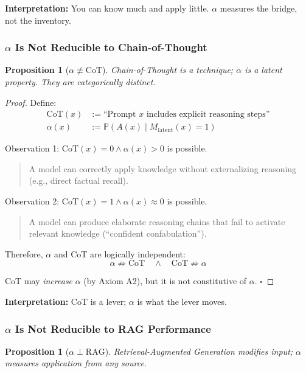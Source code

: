 \documentclass[11pt,a4paper]{article}
\newtheorem{proposition}[theorem]{Proposition}
\begin{document}
\textbf{Interpretation:} You can know much and apply little. $\alpha$ measures the bridge, not the inventory.


\subsubsection{$\alpha$ Is Not Reducible to Chain-of-Thought}

\begin{proposition}[$\alpha \not\equiv \text{CoT}$]
Chain-of-Thought is a technique; $\alpha$ is a latent property. They are categorically distinct.
\end{proposition}

\begin{proof}
Define:
\begin{align*}
\text{CoT}(x) &:= \text{``Prompt } x \text{ includes explicit reasoning steps''} \\
\alpha(x) &:= \mathbb{P}(A(x) \mid M_{\text{latent}}(x) = 1)
\end{align*}

Observation 1: $\text{CoT}(x) = 0 \land \alpha(x) > 0$ is possible.
\begin{quote}
A model can correctly apply knowledge without externalizing reasoning (e.g., direct factual recall).
\end{quote}

Observation 2: $\text{CoT}(x) = 1 \land \alpha(x) \approx 0$ is possible.
\begin{quote}
A model can produce elaborate reasoning chains that fail to activate relevant knowledge (``confident confabulation'').
\end{quote}

Therefore, $\alpha$ and CoT are logically independent:
\[
\alpha \not\Rightarrow \text{CoT} \quad \land \quad \text{CoT} \not\Rightarrow \alpha
\]

CoT may \emph{increase} $\alpha$ (by Axiom A2), but it is not constitutive of $\alpha$. $\square$
\end{proof}

\textbf{Interpretation:} CoT is a lever; $\alpha$ is what the lever moves.


\subsubsection{$\alpha$ Is Not Reducible to RAG Performance}

\begin{proposition}[$\alpha \perp \text{RAG}$]
Retrieval-Augmented Generation modifies input; $\alpha$ measures application from any source.
\end{proposition}
\end{document}
